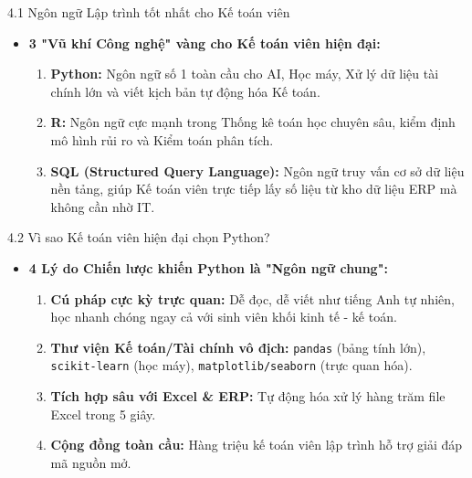 \documentclass[aspectratio=169]{beamer}
\begin{document}
\begin{frame}{4.1 Ngôn ngữ Lập trình tốt nhất cho Kế toán viên}
    \begin{itemize}
        \item \textbf{3 "Vũ khí Công nghệ" vàng cho Kế toán viên hiện đại:}
        \begin{enumerate}
            \item \textbf{Python:} Ngôn ngữ số 1 toàn cầu cho AI, Học máy, Xử lý dữ liệu tài chính lớn và viết kịch bản tự động hóa Kế toán.
            \item \textbf{R:} Ngôn ngữ cực mạnh trong Thống kê toán học chuyên sâu, kiểm định mô hình rủi ro và Kiểm toán phân tích.
            \item \textbf{SQL (Structured Query Language):} Ngôn ngữ truy vấn cơ sở dữ liệu nền tảng, giúp Kế toán viên trực tiếp lấy số liệu từ kho dữ liệu ERP mà không cần nhờ IT.
        \end{enumerate}
    \end{itemize}
\end{frame}

\begin{frame}{4.2 Vì sao Kế toán viên hiện đại chọn Python?}
    \begin{itemize}
        \item \textbf{4 Lý do Chiến lược khiến Python là "Ngôn ngữ chung":}
        \begin{enumerate}
            \item \textbf{Cú pháp cực kỳ trực quan:} Dễ đọc, dễ viết như tiếng Anh tự nhiên, học nhanh chóng ngay cả với sinh viên khối kinh tế - kế toán.
            \item \textbf{Thư viện Kế toán/Tài chính vô địch:} \texttt{pandas} (bảng tính lớn), \texttt{scikit-learn} (học máy), \texttt{matplotlib/seaborn} (trực quan hóa).
            \item \textbf{Tích hợp sâu với Excel \& ERP:} Tự động hóa xử lý hàng trăm file Excel trong 5 giây.
            \item \textbf{Cộng đồng toàn cầu:} Hàng triệu kế toán viên lập trình hỗ trợ giải đáp mã nguồn mở.
        \end{enumerate}
    \end{itemize}
\end{frame}
\end{document}
